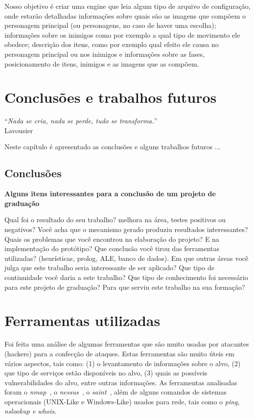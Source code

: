 \documentclass[brazil]{abnt}
\begin{document}
Nosso objetivo é criar uma engine que leia algum tipo de arquivo de configuração, onde estarão detalhadas informações sobre quais são as imagens que compõem o personagem principal (ou personagens, no caso de haver uma escolha); informações sobre os inimigos como por exemplo a qual tipo de movimento ele obedece; descrição dos itens, como por exemplo qual efeito ele causa no personagem principal ou nos inimigos e informações sobre as fases, posicionamento de itens, inimigos e as imagens que as compõem.

\chapter{Conclusões e trabalhos futuros\label{cap:conclusao}}

\vfill{}
\begin{flushright}{}``\emph{Nada se cria, nada se perde, tudo se
transforma.}''\\
{\small Lavousier}\end{flushright}{\small \par}
\vfill{}

Neste capítulo é apresentado as conclusões e alguns trabalhos futuros
...
\newpage


\section{Conclusões}

{\bf Alguns itens interessantes para a conclusão de um projeto de graduação}

Qual foi o resultado do seu trabalho? melhora na área, testes positivos ou negativos?
Você acha que o mecanismo gerado produziu resultados interessantes?
Quais os problemas que você encontrou na elaboração do projeto?
E na implementação do protótipo?
Que conclusão você tirou das ferramentas utilizadas? (heurísticas, prolog, ALE, banco de dados).
Em que outras áreas você julga que este trabalho seria interessante de ser aplicado?
Que tipo de continuidade você daria a este trabalho?
Que tipo de conhecimento foi necessário para este projeto de graduação?
Para que serviu este trabalho na sua formação?






\anexo


\chapter{Ferramentas utilizadas}

Foi feita uma análise de algumas ferramentas que são muito usadas
por atacantes (hackers) para a confecção de ataques. Estas ferramentas
são muito úteis em vários aspectos, tais como: (1) o levantamento
de informações sobre o alvo, (2) que tipo de serviços estão disponíveis
no alvo, (3) quais as possíveis vulnerabilidades do alvo, entre outras
informações. As ferramentas analisadas foram o \emph{nmap}~\cite{dns2002},
o \emph{nessus}~\cite{William86}, o \emph{saint}~\cite{rhoden}, além
de alguns comandos de sistemas operacionais (UNIX-Like e Windows-Like)
usados para rede, tais como o \emph{ping, nslookup e whois}. 
\end{document}

